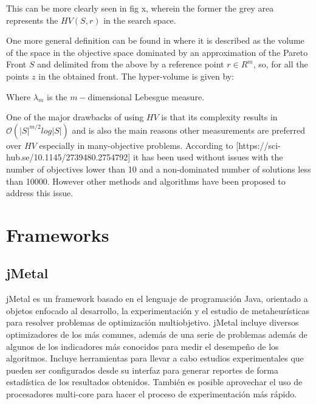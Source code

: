 This can be more clearly seen in fig x, wherein the former the grey area represents the $HV(S,r)$ in the search space.


One more general definition can be found in %
where it is described as the volume of the space in the objective space dominated by an approximation of the Pareto Front $S$ and delimited from the above by a reference point $r \in R^{m} $, so, for all the points $z$ in the obtained front. The hyper-volume is given by:


Where $\lambda_m$ is the $m-$dimensional Lebesgue measure.

One of the major drawbacks of using $HV$ is that its complexity results in $\mathcal{O}(|S|^{m/2}log|S|)$ and is also the main reasons other measurements are preferred over $HV$ especially in many-objective problems. According to [https://sci-hub.se/10.1145/2739480.2754792] it has been used without issues with the number of objectives lower than 10 and a non-dominated number of solutions less than 10000. However other methods and algorithms have been proposed to address this issue.



\section{Frameworks}
\subsection{jMetal}

jMetal es un framework basado en el lenguaje de programación Java, orientado a objetos enfocado al desarrollo, la experimentación y el estudio de metaheurísticas para resolver problemas de optimización multiobjetivo. jMetal incluye diversos optimizadores de los más comunes, además de una serie de problemas además de algunos de los indicadores más conocidos para medir el desempeño de los algoritmos. Incluye herramientas para llevar a cabo estudios experimentales que pueden ser configurados desde su interfaz para generar reportes de forma estadística de los resultados obtenidos. También es posible  aprovechar el uso de procesadores multi-core para hacer el proceso de experimentación más rápido.\\

